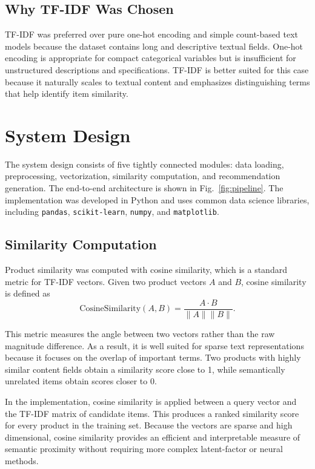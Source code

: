 \documentclass[conference]{IEEEtran}
\begin{document}
\subsection{Why TF-IDF Was Chosen}
TF-IDF was preferred over pure one-hot encoding and simple count-based text models because the dataset contains long and descriptive textual fields. One-hot encoding is appropriate for compact categorical variables but is insufficient for unstructured descriptions and specifications. TF-IDF is better suited for this case because it naturally scales to textual content and emphasizes distinguishing terms that help identify item similarity.

\section{System Design}
The system design consists of five tightly connected modules: data loading, preprocessing, vectorization, similarity computation, and recommendation generation. The end-to-end architecture is shown in Fig.~\ref{fig:pipeline}. The implementation was developed in Python and uses common data science libraries, including \texttt{pandas}, \texttt{scikit-learn}, \texttt{numpy}, and \texttt{matplotlib}.

\subsection{Similarity Computation}
Product similarity was computed with cosine similarity, which is a standard metric for TF-IDF vectors. Given two product vectors $A$ and $B$, cosine similarity is defined as
\begin{equation}
\text{CosineSimilarity}(A, B) = \frac{A \cdot B}{\|A\| \|B\|}.
\end{equation}

This metric measures the angle between two vectors rather than the raw magnitude difference. As a result, it is well suited for sparse text representations because it focuses on the overlap of important terms. Two products with highly similar content fields obtain a similarity score close to 1, while semantically unrelated items obtain scores closer to 0.

In the implementation, cosine similarity is applied between a query vector and the TF-IDF matrix of candidate items. This produces a ranked similarity score for every product in the training set. Because the vectors are sparse and high dimensional, cosine similarity provides an efficient and interpretable measure of semantic proximity without requiring more complex latent-factor or neural methods.
\end{document}
